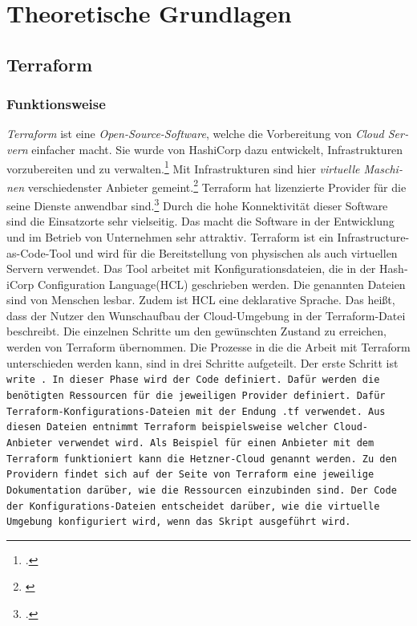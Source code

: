 \section{Theoretische Grundlagen} 
\subsection{Terraform}
\begin{otherlanguage}{ngerman}
\subsubsection{Funktionsweise}
\textit{Terraform} ist eine \textit{Open-Source-Software}, welche die Vorbereitung von \textit{Cloud Servern} einfacher macht. Sie wurde von HashiCorp dazu entwickelt, Infrastrukturen vorzubereiten und zu verwalten.\footcite{introform} Mit Infrastrukturen sind hier \textit{virtuelle Maschinen} verschiedenster Anbieter gemeint.\footnote{\cite{Terraform}} Terraform hat lizenzierte Provider für die seine Dienste anwendbar sind.\footcite{TerraProviders} Durch die hohe Konnektivität dieser Software sind die Einsatzorte sehr vielseitig. Das macht die Software in der Entwicklung und im Betrieb von Unternehmen sehr attraktiv. 
\newline
\newline
Terraform ist ein Infrastructure-as-Code-Tool und wird für die Bereitstellung von physischen als auch virtuellen Servern verwendet. Das Tool arbeitet mit Konfigurationsdateien, die in der HashiCorp Configuration Language(HCL) geschrieben werden. Die genannten Dateien sind von Menschen lesbar. Zudem ist HCL eine deklarative Sprache. Das heißt, dass der Nutzer den Wunschaufbau der Cloud-Umgebung in der Terraform-Datei beschreibt. Die einzelnen Schritte um den gewünschten Zustand zu erreichen, werden von Terraform übernommen. 
\newline
Die Prozesse in die die Arbeit mit Terraform unterschieden werden kann, sind in drei Schritte aufgeteilt. Der erste Schritt ist \tt write \rm. In dieser Phase wird der Code definiert. Dafür werden die benötigten Ressourcen für die jeweiligen Provider definiert. Dafür Terraform-Konfigurations-Dateien mit der Endung \tt .tf \rm verwendet. Aus diesen Dateien entnimmt Terraform beispielsweise welcher Cloud-Anbieter verwendet wird. Als Beispiel für einen Anbieter mit dem Terraform funktioniert kann die \dq Hetzner-Cloud \dq{} genannt werden. Zu den Providern findet sich auf der Seite von Terraform eine jeweilige Dokumentation darüber, wie die Ressourcen einzubinden sind. Der Code der Konfigurations-Dateien entscheidet darüber, wie die virtuelle Umgebung konfiguriert wird, wenn das Skript ausgeführt wird. 
\newpage


\end{otherlanguage}
